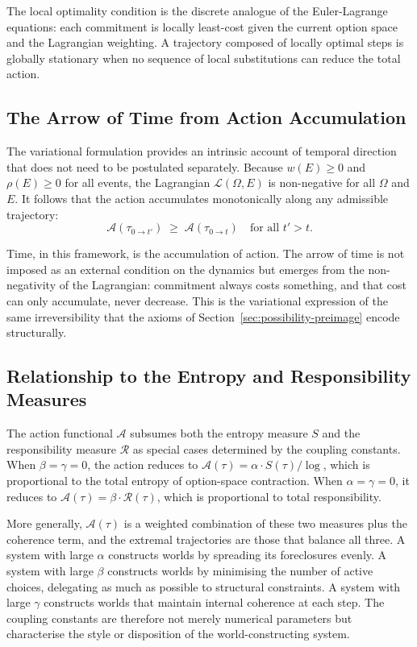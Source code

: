 \documentclass[12pt]{article}
\theoremstyle{plain}
\theoremstyle{definition}
\theoremstyle{remark}
\begin{document}
The local optimality condition is the discrete analogue of the Euler-Lagrange
equations: each commitment is locally least-cost given the current option space
and the Lagrangian weighting.  A trajectory composed of locally optimal steps
is globally stationary when no sequence of local substitutions can reduce the
total action.

\subsection{The Arrow of Time from Action Accumulation}

The variational formulation provides an intrinsic account of temporal direction
that does not need to be postulated separately.  Because $w(E) \geq 0$ and
$\rho(E) \geq 0$ for all events, the Lagrangian $\mathcal{L}(\Omega, E)$ is
non-negative for all $\Omega$ and $E$.  It follows that the action accumulates
monotonically along any admissible trajectory:
\[
  \mathcal{A}(\tau_{0 \to t'}) \;\geq\; \mathcal{A}(\tau_{0 \to t})
  \quad\text{for all } t' > t.
\]

Time, in this framework, is the accumulation of action.  The arrow of time is
not imposed as an external condition on the dynamics but emerges from the
non-negativity of the Lagrangian: commitment always costs something, and that
cost can only accumulate, never decrease.  This is the variational expression
of the same irreversibility that the axioms of Section~\ref{sec:possibility-preimage}
encode structurally.

\subsection{Relationship to the Entropy and Responsibility Measures}

The action functional $\mathcal{A}$ subsumes both the entropy measure $S$ and
the responsibility measure $\mathcal{R}$ as special cases determined by the
coupling constants.  When $\beta = \gamma = 0$, the action reduces to
$\mathcal{A}(\tau) = \alpha \cdot S(\tau) / \log$, which is proportional to
the total entropy of option-space contraction.  When $\alpha = \gamma = 0$, it
reduces to $\mathcal{A}(\tau) = \beta \cdot \mathcal{R}(\tau)$, which is
proportional to total responsibility.

More generally, $\mathcal{A}(\tau)$ is a weighted combination of these two
measures plus the coherence term, and the extremal trajectories are those that
balance all three.  A system with large $\alpha$ constructs worlds by spreading
its foreclosures evenly.  A system with large $\beta$ constructs worlds by
minimising the number of active choices, delegating as much as possible to
structural constraints.  A system with large $\gamma$ constructs worlds that
maintain internal coherence at each step.  The coupling constants are therefore
not merely numerical parameters but characterise the style or disposition of
the world-constructing system.
\end{document}
